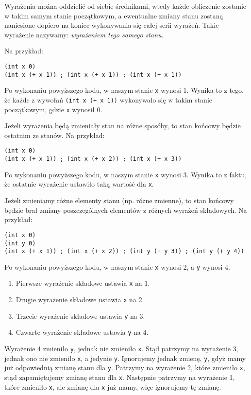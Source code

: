 \documentclass{article}
\begin{document}
Wyrażenia można oddzielić od siebie średnikami, wtedy każde obliczenie zostanie w takim samym stanie początkowym, a ewentualne zmiany stanu zostaną naniesione dopiero na koniec wykonywania się całej serii wyrażeń. Takie wyrażenie nazywamy: \textit{wyrażeniem tego samego stanu}.

Na przykład:

\begin{lstlisting}
(int x 0)
(int x (+ x 1)) ; (int x (+ x 1)) ; (int x (+ x 1))
\end{lstlisting}

Po wykonaniu powyższego kodu, w naszym stanie \texttt{x} wynosi 1. Wynika to z tego, że każde z wywołań \texttt{(int x (+ x 1))} wykonywało się w takim stanie początkowym, gdzie \texttt{x} wynosił 0.

Jeżeli wyrażenia będą zmieniały stan na różne sposóby, to stan końcowy będzie ostatnim ze stanów. Na przykład:

\begin{lstlisting}
(int x 0)
(int x (+ x 1)) ; (int x (+ x 2)) ; (int x (+ x 3))
\end{lstlisting}

Po wykonaniu powyższego kodu, w naszym stanie \texttt{x} wynosi 3. Wynika to z faktu, że ostatnie wyrażenie ustawiło taką wartość dla \texttt{x}.

Jeżeli zmieniamy różne elementy stanu (np. różne zmienne), to stan końcowy będzie brał zmiany poszczególnych elementów z różnych wyrażeń składowych. Na przykład:

\begin{lstlisting}
(int x 0)
(int y 0)
(int x (+ x 1)) ; (int x (+ x 2)) ; (int y (+ y 3)) ; (int y (+ y 4))
\end{lstlisting}

Po wykonaniu powyższego kodu, w naszym stanie \texttt{x} wynosi 2, a \texttt{y} wynosi 4.

\begin{enumerate}
    \item Pierwsze wyrażenie składowe ustawia \texttt{x} na 1.
    \item Drugie wyrażenie składowe ustawia \texttt{x} na 2.
    \item Trzecie wyrażenie składowe ustawia \texttt{y} na 3.
    \item Czwarte wyrażenie składowe ustawia \texttt{y} na 4.
\end{enumerate}

Wyrażenie 4 zmieniło \texttt{y}, jednak nie zmieniło \texttt{x}. Stąd patrzymy na wyrażenie 3, jednak ono nie zmieniło \texttt{x}, a jedynie \texttt{y}. Ignorujemy jednak zmienę, \texttt{y}, gdyż mamy już odpowiednią zmianę stanu dla \texttt{y}. Patrzymy na wyrażenie 2, które zmieniło \texttt{x}, stąd zapamiętujemy zmianę stanu dla \texttt{x}. Następnie patrzymy na wyrażenie 1, tkóre zmieniło \texttt{x}, ale zmianę dla \texttt{x} już mamy, więc ignorujemy tę zmianę.
\end{document}
